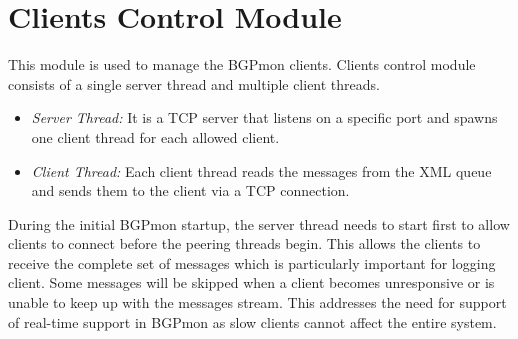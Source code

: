 \section{Clients Control Module}
\label{sec:clients}
This module is used to manage the BGPmon clients. Clients control module consists of a single server thread and multiple client threads.
\begin{itemize}
\item{\emph{Server Thread:} It is a TCP server that listens on a specific port and spawns one client thread for each allowed client. }
\item{\emph{Client Thread:} Each client thread reads the messages from the XML queue and sends them to the client via a TCP connection.}
\end{itemize}
During the initial BGPmon startup, the server thread needs to start first to allow clients to connect before the peering threads begin.  This allows the clients to receive the complete set of messages which is particularly important for logging client.
Some messages will be skipped when a client becomes unresponsive or is unable to keep up with the messages stream. This addresses the need for support of real-time support in BGPmon as slow clients cannot affect the entire system.


